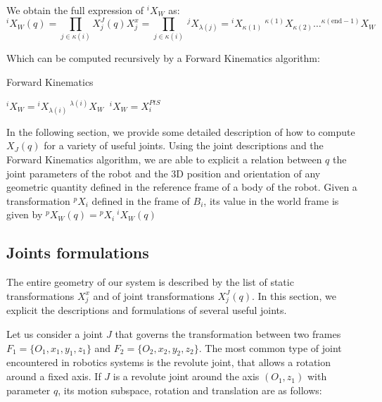 We obtain the full expression of ${}^i X_W$ as:
\begin{equation}
  {}^i X_W (q) = \prod_{j\in\kappa (i)}X^J_j (q) X^x_j = \prod_{j\in\kappa (i)}\ {}^j X_{\lambda (j)}
  = {}^i X_{\kappa (1)}\ ^{\kappa (1)}X_{\kappa (2)} \dots ^{\kappa (\text{end}-1)}X_{W}
\end{equation}

Which can be computed recursively by a Forward Kinematics algorithm:

\begin{algorithm}
  \caption{Forward Kinematics}
\label{alg:FK}
\begin{algorithmic}
   ${}^i X_W = {}^i X_{\lambda (i)}\ ^{\lambda (i)}X_W$
  \Else$\ {}^i X_W = X^{PtS}_i$
  \EndIf{}
  \EndFor{}
\end{algorithmic}
\end{algorithm}

In the following section, we provide some detailed description of how to compute $X_J (q)$ for a variety of useful joints.
Using the joint descriptions and the Forward Kinematics algorithm, we are able to explicit a relation between $q$ the joint parameters of the robot and the 3D position and orientation of  any geometric quantity defined in the reference frame of a body of the robot.
Given a transformation ${}^p X_i$ defined in the frame of $B_i$, its value in the world frame is given by ${}^p X_W (q) = {}^p X_i\ {}^i X_W (q)$



\subsection{Joints formulations}
\label{sub:joints_formulations}


The entire geometry of our system is described by the list of static transformations $X^x_j$ and of joint transformations $X^J_j (q)$.
In this section, we explicit the descriptions and formulations of several useful joints.

Let us consider a joint $J$ that governs the transformation between two frames $F_1=\{O_1, x_1, y_1, z_1\}$ and $F_2=\{O_2, x_2, y_2, z_2\}$.
The most common type of joint encountered in robotics systems is the revolute joint, that allows a rotation around a fixed axis.
If $J$ is a revolute joint around the axis $(O_1,z_1)$ with parameter $q$, its motion subspace, rotation and translation are as follows:

